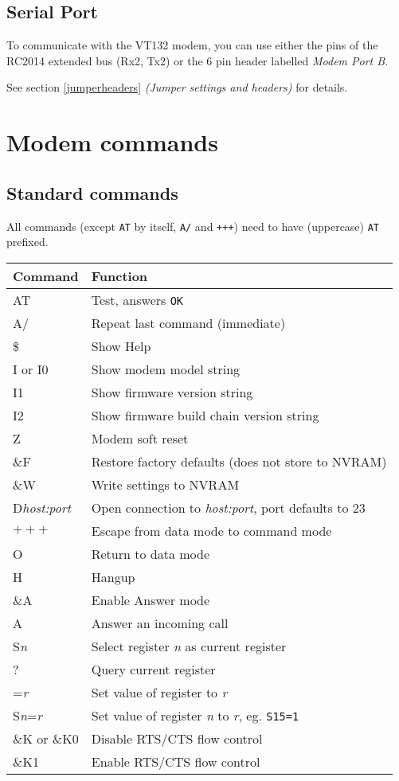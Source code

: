 \subsection{Serial Port}

To communicate with the VT132 modem, you can use either the pins of the RC2014 extended bus (Rx2, Tx2) or the 6 pin header labelled \textit{Modem Port B}.

See section \vref{jumperheaders} \textit{(Jumper settings and headers)} for details.

\newpage
\section{Modem commands}
\subsection{Standard commands}

All commands (except \texttt{AT} by itself, \texttt{A/} and \texttt{+++}) need to have (uppercase) \texttt{AT} prefixed.

\begin{tabular}{p{6em} | p{}}
\hline
\textbf{Command} & \textbf{Function} \\
\hline
AT			& Test, answers \texttt{OK} \\
A/			& Repeat last command (immediate) \\
\$			& Show Help \\
I or I0		& Show modem model string \\
I1			& Show firmware version string \\
I2			& Show firmware build chain version string \\
Z			& Modem soft reset \\
\&F			& Restore factory defaults (does not store to NVRAM) \\
\&W 		& Write settings to NVRAM \\
D\textit{host:port}	& Open connection to \textit{host:port}, port defaults to 23 \\
$+++$		& Escape from data mode to command mode \\
O			& Return to data mode \\
H			& Hangup \\
\&A			& Enable Answer mode \\
A			& Answer an incoming call \\
S\textit{n}	& Select register \textit{n} as current register \\
?			& Query current register \\
=\textit{r}	& Set value of register to \textit{r} \\
S\textit{n}=\textit{r}	& Set value of register \textit{n} to \textit{r}, eg. \texttt{S15=1} \\
\&K or \&K0	& Disable RTS/CTS flow control \\
\&K1		& Enable RTS/CTS flow control \\
\hline
\end{tabular}

